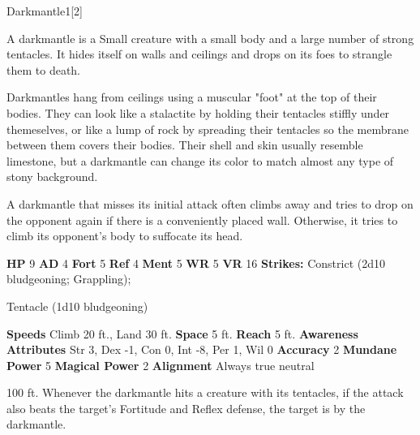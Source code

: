   \begin{monsection}{Darkmantle}{1}[2]
    \vspace{-1em}\vspace{-1em}
    \vspace{0em}

    
        A darkmantle is a Small creature with a small body and a large number of strong tentacles.
        It hides itself on walls and ceilings and drops on its foes to strangle them to death.
      
        Darkmantles hang from ceilings using a muscular "foot" at the top of their bodies.
        They can look like a stalactite by holding their tentacles stiffly under themeselves, or like a lump of rock by spreading their tentacles so the membrane between them covers their bodies.
        Their shell and skin usually resemble limestone, but a darkmantle can change its color to match almost any type of stony background.
      
        A darkmantle that misses its initial attack often climbs away and tries to drop on the opponent again if there is a conveniently placed wall.
        Otherwise, it tries to climb its opponent's body to suffocate its head.
      

    \begin{spellcontent}
      \begin{spelltargetinginfo}
        \pari \textbf{HP} 9 \monsep
          \textbf{AD} 4 \monsep
          \textbf{Fort} 5 \monsep
          \textbf{Ref} 4 \monsep
          \textbf{Ment} 5
        \pari \textbf{WR} 5 \monsep
        \textbf{VR} 16
        \pari \textbf{Strikes:}
            Constrict  (2d10 bludgeoning; Grappling);
\par Tentacle  (1d10 bludgeoning)
      \end{spelltargetinginfo}
    \end{spellcontent}
    \begin{monsterfooter}
      \pari \textbf{Speeds} Climb 20 ft., Land 30 ft. \monsep
        \textbf{Space} 5 ft. \monsep
        \textbf{Reach} 5 ft.
      \pari \textbf{Awareness} 
      \pari \textbf{Attributes}
        Str 3, Dex -1,
        Con 0, Int -8,
        Per 1, Wil 0
      \pari \textbf{Accuracy} 2 \monsep
        \textbf{Mundane Power} 5 \monsep
      \textbf{Magical Power} 2
      \pari \textbf{Alignment} Always true neutral
    \end{monsterfooter}
  \end{monsection}
   100 ft.
          Whenever the darkmantle hits a creature with its tentacles, if the attack also beats the target's Fortitude and Reflex defense,
          the target is  by the darkmantle.
  
